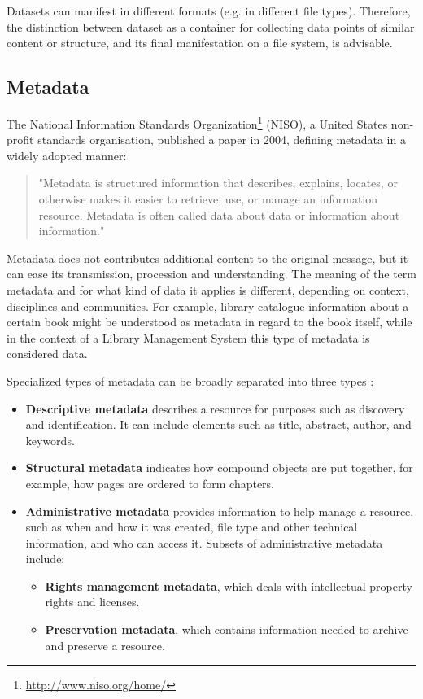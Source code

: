 \documentclass[a4paper,english,twoside,BCOR1.5cm,headsepline,DIV12,appendixprefix,final,12pt]{scrbook}
\newcommand\footnoteurl[1]{\footnote{\scriptsize\url{#1}}}
\begin{document}
Datasets can manifest in different formats (e.g. in different file types). Therefore, the distinction between dataset as a container for collecting data points of similar content or structure, and its final manifestation on a file system, is advisable.


\subsection{Metadata}
\label{sec:metadata}

The National Information Standards Organization\footnoteurl{http://www.niso.org/home/} (NISO), a United States non-profit standards organisation, published a paper in 2004, defining metadata in a widely adopted manner:

\begin{quote}
"Metadata is structured information
that describes, explains,
locates, or otherwise makes it
easier to retrieve, use, or manage
an information resource. Metadata
is often called data about data or
information about information." \cite{NISO2004}
\end{quote}

Metadata does not contributes additional content to the original message, but it can ease its transmission, procession and understanding.
The meaning of the term metadata and for what kind of data it applies is different, depending on context, disciplines and communities.
For example, library catalogue information about a certain book might be understood as metadata in regard to the book itself, while in the context of a Library Management System this type of metadata is considered data.

Specialized types of metadata can be broadly separated into three types \cite{NISO2004}:

\begin{itemize}
\item \textbf{Descriptive metadata} describes a resource for purposes such as discovery and identification. It can include elements such as title, abstract, author, and keywords. 
\item \textbf{Structural metadata} indicates how compound objects are put together, for example, how pages are ordered to form chapters.
\item \textbf{Administrative metadata} provides information to help manage a resource, such as when and how it was created, file type and other technical information, and who can access it. Subsets of administrative metadata include:
\begin{itemize}
\item \textbf{Rights management metadata}, which deals with intellectual property rights and licenses.
\item \textbf{Preservation metadata}, which contains information needed to archive and preserve a resource.
\end{itemize}
\end{itemize}
\end{document}
